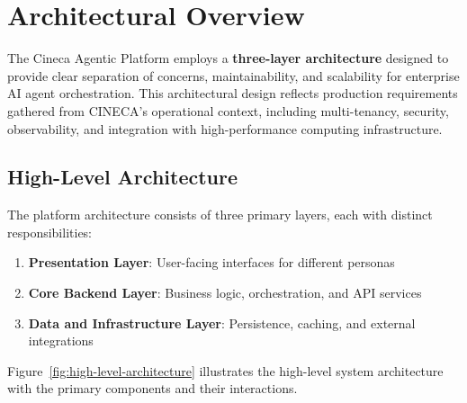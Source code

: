 
\section{Architectural Overview}
\label{sec:arch-overview}

The Cineca Agentic Platform employs a \textbf{three-layer architecture} designed to provide clear separation of concerns, maintainability, and scalability for enterprise AI agent orchestration. This architectural design reflects production requirements gathered from CINECA's operational context, including multi-tenancy, security, observability, and integration with high-performance computing infrastructure.

\subsection{High-Level Architecture}

The platform architecture consists of three primary layers, each with distinct responsibilities:

\begin{enumerate}
    \item \textbf{Presentation Layer}: User-facing interfaces for different personas
    \item \textbf{Core Backend Layer}: Business logic, orchestration, and API services
    \item \textbf{Data and Infrastructure Layer}: Persistence, caching, and external integrations
\end{enumerate}

Figure~\ref{fig:high-level-architecture} illustrates the high-level system architecture with the primary components and their interactions.

